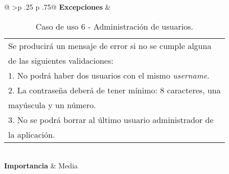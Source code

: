 \begin{table}[h]
\begin{tabular}{@{}
			>{}p {.25\textwidth} p {.75\textwidth}@{}}
		\textbf{Excepciones}     &  \begin{tabular}[c]{@{}l@{}}
										Se producirá un mensaje de error si no se cumple alguna \\
										de las siguientes validaciones:\\ 
										1. No podrá haber dos usuarios con el mismo \textit{username}.\\
										2. La contraseña deberá de tener mínimo: 8 caracteres, una \\
										mayúscula y un número.\\
										3. No se podrá borrar al último usuario administrador de \\
										la aplicación.\\
										
									\end{tabular} \\ \midrule
		\textbf{Importancia}     &  Media \\ \bottomrule
	\end{tabular}
	\caption{Caso de uso 6 - Administración de usuarios.}
\end{table}


